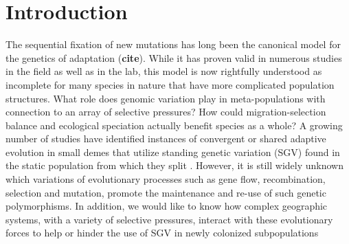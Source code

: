 \documentclass{article}
\newcommand{\plr}[1]{\todo[linecolor=blue,backgroundcolor=blue!25,bordercolor=blue]{#1}}
\begin{document}

\section*{Introduction}


The sequential fixation of new mutations has long been the canonical model for the genetics of adaptation (\textbf{cite}). While it has proven valid in numerous studies in the field as well as in the lab, this model is now rightfully understood as incomplete for many species in nature that have more complicated population structures. What role does genomic variation play in meta-populations with connection to an array of selective pressures? How could migration-selection balance and ecological speciation actually benefit species as a whole? A growing number of studies have identified instances of convergent or shared adaptive evolution in small demes that utilize standing genetic variation (SGV) found in the static population from which they split \citet{nelson2017ancient,Schrider2017,Barrett2008}. However, it is still widely unknown which variations of evolutionary processes such as gene flow, recombination, selection and mutation, promote the maintenance and re-use of such genetic polymorphisms. In addition, we would like to know how complex geographic systems, with a variety of selective pressures, interact with these evolutionary forces to help or hinder the use of SGV in newly colonized subpopulations

\end{document}
